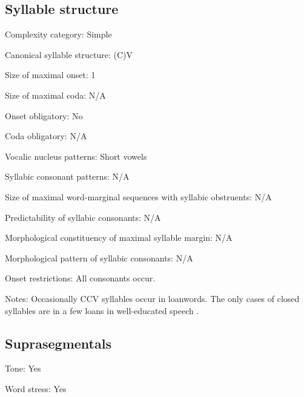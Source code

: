 {\subsection*{Syllable structure}
\begin{appendixdesc}

\item[Complexity category:] Simple

\item[Canonical syllable structure:] (C)V \citep[112--114]{Morse1976}

\item[Size of maximal onset:] 1

\item[Size of maximal coda:] N/A

\item[Onset obligatory:] No

\item[Coda obligatory:] N/A

\item[Vocalic nucleus patterns:] Short vowels

\item[Syllabic consonant patterns:] N/A

\item[Size of maximal word-marginal sequences with syllabic obstruents:] N/A

\item[Predictability of syllabic consonants:] N/A

\item[Morphological constituency of maximal syllable margin:] N/A

\item[Morphological pattern of syllabic consonants:] N/A

\item[Onset restrictions:] All consonants occur.

\item[Notes:] Occasionally CCV syllables occur in loanwords. The only cases of closed syllables are in a few  loans in well-educated speech \citep[113]{Morse1976}.
\end{appendixdesc}
\subsection*{Suprasegmentals}
\begin{appendixdesc}
\item[Tone:] Yes

\item[Word stress:] Yes


\end{appendixdesc}}
